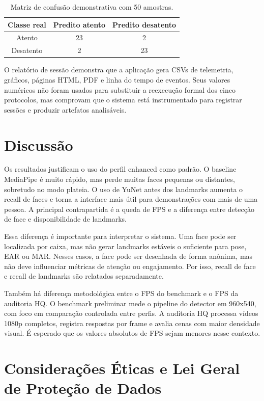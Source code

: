 \documentclass[12pt]{article}
\begin{document}
\begin{table}[!htbp]
\centering
\caption{Matriz de confusão demonstrativa com 50 amostras.}
\label{tab:confusao}
\small
\begin{tabular}{|c|c|c|}
\hline
\textbf{Classe real} & \textbf{Predito atento} & \textbf{Predito desatento}\\
\hline
Atento & 23 & 2\\
\hline
Desatento & 2 & 23\\
\hline
\end{tabular}
\end{table}

O relatório de sessão demonstra que a aplicação gera CSVs de telemetria, gráficos, páginas HTML, PDF e linha do tempo de eventos. Seus valores numéricos não foram usados para substituir a reexecução formal dos cinco protocolos, mas comprovam que o sistema está instrumentado para registrar sessões e produzir artefatos analisáveis.

\section{Discussão}

Os resultados justificam o uso do perfil enhanced como padrão. O baseline MediaPipe é muito rápido, mas perde muitas faces pequenas ou distantes, sobretudo no modo plateia. O uso de YuNet antes dos landmarks aumenta o recall de faces e torna a interface mais útil para demonstrações com mais de uma pessoa. A principal contrapartida é a queda de FPS e a diferença entre detecção de face e disponibilidade de landmarks.

Essa diferença é importante para interpretar o sistema. Uma face pode ser localizada por caixa, mas não gerar landmarks estáveis o suficiente para pose, EAR ou MAR. Nesses casos, a face pode ser desenhada de forma anônima, mas não deve influenciar métricas de atenção ou engajamento. Por isso, recall de face e recall de landmarks são relatados separadamente.

Também há diferença metodológica entre o FPS do benchmark e o FPS da auditoria HQ. O benchmark preliminar mede o pipeline do detector em 960x540, com foco em comparação controlada entre perfis. A auditoria HQ processa vídeos 1080p completos, registra respostas por frame e avalia cenas com maior densidade visual. É esperado que os valores absolutos de FPS sejam menores nesse contexto.

\section{Considerações Éticas e Lei Geral de Proteção de Dados}
\end{document}
